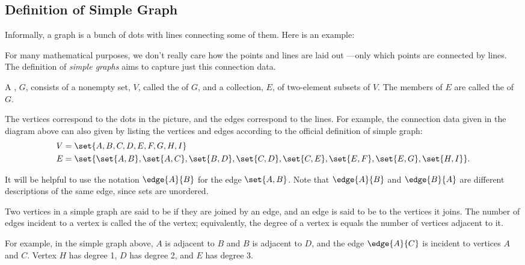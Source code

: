 \label{degreessec}

\subsection{Definition of Simple Graph}
Informally, a graph is a bunch of dots with lines connecting some of
them.  Here is an example:


For many mathematical purposes, we don't really care how the points and
lines are laid out ---only which points are connected by lines.  The
definition of \emph{simple graphs} aims to capture just this connection
data.

\begin{definition}\label{graphdef} 
A , $G$, consists of a nonempty set, $V$, called the
 of $G$, and a collection, $E$, of two-element subsets of
$V$.  The members of $E$ are called the  of $G$.
\end{definition}
The vertices correspond to the dots in the picture, and the edges
correspond to the lines.  For example, the connection data given in the
diagram above can also given by listing the vertices and edges according
to the official definition of simple graph:
\begin{align*}
V & =  \set{A, B, C, D, E, F, G, H, I} \\
E & =  \set{ \set{A, B}, \set{A, C}, \set{B, D}, \set{C, D},
              \set{C, E}, \set{E, F}, \set{E, G}, \set{H, I} }.
\end{align*}          

It will be helpful to use the notation $\edge{A}{B}$ for the edge
$\set{A,B}$.  Note that $\edge{A}{B}$ and $\edge{B}{A}$ are different
descriptions of the same edge, since sets are unordered.

\begin{definition}
Two vertices in a simple graph are said to be  if they are
joined by an edge, and an edge is said to be  to the
vertices it joins.  The number of edges incident to a vertex is called the
 of the vertex; equivalently, the degree of a vertex is
equals the number of vertices adjacent to it.
\end{definition}
For example, in the simple graph above, $A$ is adjacent to $B$ and $B$ is
adjacent to $D$, and the edge $\edge{A}{C}$ is incident to vertices $A$
and $C$.  Vertex $H$ has degree 1, $D$ has degree 2, and $E$ has degree 3.

